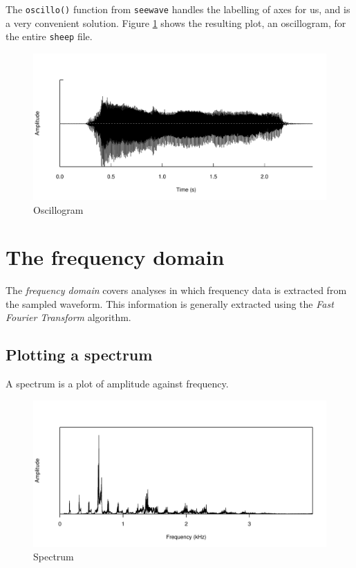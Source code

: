 \documentclass[
]{book}
\begin{document}
The \texttt{oscillo()} function from \texttt{seewave} handles the labelling of axes for us, and is a very convenient solution. Figure \ref{fig:amplitude-oscillo} shows the resulting plot, an oscillogram, for the entire \texttt{sheep} file.

\begin{figure}

{\centering \includegraphics[width=0.9\linewidth]{_main_files/figure-latex/amplitude-oscillo-1} 

}

\caption{Oscillogram}\label{fig:amplitude-oscillo}
\end{figure}

\hypertarget{the-frequency-domain}{%
\section{The frequency domain}\label{the-frequency-domain}}

The \emph{frequency domain} covers analyses in which frequency data is extracted from the sampled waveform. This information is generally extracted using the \emph{Fast Fourier Transform} algorithm.

\hypertarget{plotting-a-spectrum}{%
\subsection{Plotting a spectrum}\label{plotting-a-spectrum}}

A spectrum is a plot of amplitude against frequency.

\begin{figure}

{\centering \includegraphics[width=0.9\linewidth]{_main_files/figure-latex/spectrum-1} 

}

\caption{Spectrum}\label{fig:spectrum}
\end{figure}
\end{document}
